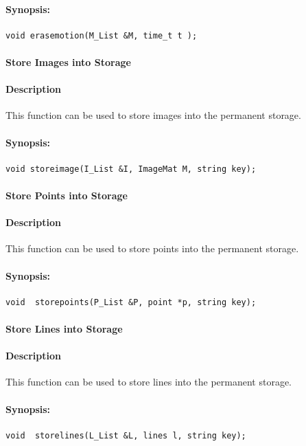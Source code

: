 \paragraph{Synopsis:}
\begin{lstlisting}
void erasemotion(M_List &M, time_t t );
\end{lstlisting}


\paragraph{ Store  Images into  Storage}
\paragraph{Description}
This function can be used to store images into the permanent storage. 
\paragraph{Synopsis:}
\begin{lstlisting}
void storeimage(I_List &I, ImageMat M, string key);
\end{lstlisting}

\paragraph{ Store  Points into  Storage}
\paragraph{Description}
This function can be used to store points into the permanent storage. 
\paragraph{Synopsis:}
\begin{lstlisting}
void  storepoints(P_List &P, point *p, string key);
\end{lstlisting}

\paragraph{ Store  Lines into  Storage}
\paragraph{Description}
This function can be used to store lines into the permanent storage. 
\paragraph{Synopsis:}
\begin{lstlisting}
void  storelines(L_List &L, lines l, string key);
\end{lstlisting}


